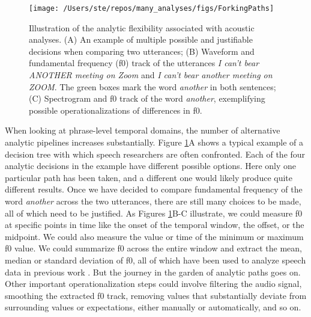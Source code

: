 \documentclass[Review,times,sageh]{sagej}
\begin{document}
\begin{figure}
\texttt{[image: /Users/ste/repos/many\_analyses/figs/ForkingPaths]} \caption{Illustration of the analytic flexibility associated with acoustic analyses. (A) An example of multiple possible and justifiable decisions when comparing two utterances; (B) Waveform and fundamental frequency (f0) track of the utterances \emph{I can't bear ANOTHER meeting on Zoom} and \emph{I can't bear another meeting on ZOOM}. The green boxes mark the word \emph{another} in both sentences; (C) Spectrogram and f0 track of the word \emph{another}, exemplifying possible operationalizations of differences in f0.}\label{fig:forkingPaths}
\end{figure}

When looking at phrase-level temporal domains, the number of alternative analytic pipelines increases substantially.
Figure \ref{fig:forkingPaths}A shows a typical example of a decision tree with which speech researchers are often confronted.
Each of the four analytic decisions in the example have different possible options.
Here only one particular path has been taken, and a different one would likely produce quite different results.
Once we have decided to compare fundamental frequency of the word \emph{another} across the two utterances, there are still many choices to be made, all of which need to be justified.
As Figures \ref{fig:forkingPaths}B-C illustrate, we could measure f0 at specific points in time like the onset of the temporal window, the offset, or the midpoint.
We could also measure the value or time of the minimum or maximum f0 value.
We could summarize f0 across the entire window and extract the mean, median or standard deviation of f0, all of which have been used to analyze speech data in previous work \citep[see][]{gordon2017acoustic}.
But the journey in the garden of analytic paths goes on.
Other important operationalization steps could involve filtering the audio signal, smoothing the extracted f0 track, removing values that substantially deviate from surrounding values or expectations, either manually or automatically, and so on.
\end{document}
